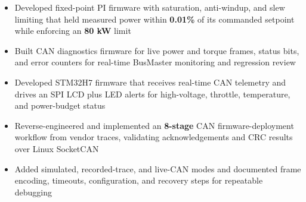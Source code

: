 \documentclass[10pt,letterpaper]{article}
\renewcommand{\entryspace}{\vspace{0pt}}
\begin{document}
\orgline{\spartanracing}
\begin{itemize}
  \item Developed fixed-point PI firmware with saturation, anti-windup, and slew limiting that held measured power within \textbf{0.01\%} of its commanded setpoint while enforcing an \textbf{80 kW} limit
  \item Built CAN diagnostics firmware for live power and torque frames, status bits, and error counters for real-time BusMaster monitoring and regression review
\end{itemize}


\orgline{\spartanracing}
\begin{itemize}
  \item Developed STM32H7 firmware that receives real-time CAN telemetry and drives an SPI LCD plus LED alerts for high-voltage, throttle, temperature, and power-budget status
\end{itemize}

\entryspace

\begin{itemize}
  \item Reverse-engineered and implemented an \textbf{8-stage} CAN firmware-deployment workflow from vendor traces, validating acknowledgements and CRC results over Linux SocketCAN
  \item Added simulated, recorded-trace, and live-CAN modes and documented frame encoding, timeouts, configuration, and recovery steps for repeatable debugging
\end{itemize}
\end{document}
